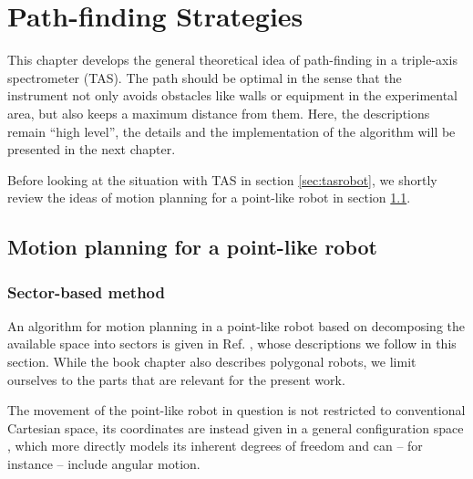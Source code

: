 %
%

\chapter{Path-finding Strategies}
\label{ch:paths}

This chapter develops the general theoretical idea of path-finding in a 
triple-axis spectrometer (TAS).
The path should be optimal in the sense that the instrument not only avoids 
obstacles like walls or equipment in the experimental area, but also keeps a 
maximum distance from them. 
Here, the descriptions remain ``high level'', the details and the implementation 
of the algorithm will be presented in the next chapter.

Before looking at the situation with TAS in section \ref{sec:tasrobot}, we shortly 
review the ideas of motion planning for a point-like robot in section \ref{sec:pointrobot}.



\section{Motion planning for a point-like robot}
\label{sec:pointrobot}

\subsection{Sector-based method}
\label{sec:pointrobot_sector}
An algorithm for motion planning in a point-like robot based on decomposing the 
available space into sectors is given in Ref. \cite[Ch. 13, pp. 283-306]{Berg2008}, 
whose descriptions we follow in this section. 
While the book chapter also describes polygonal robots, we limit ourselves to the 
parts that are relevant for the present work.

The movement of the point-like robot in question is not restricted to conventional 
Cartesian space, its coordinates are instead given in a general configuration space
\cite[Ch. 13.1, pp. 284-286]{Berg2008}, which more directly models its inherent 
degrees of freedom and can -- for instance -- include angular motion.

